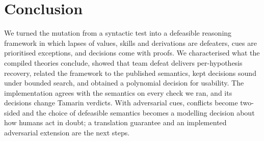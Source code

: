 \section{Conclusion}
\label{sec:conclusion}

We turned the \forget{} mutation from a syntactic test into a defeasible reasoning framework in which lapses of values, skills and derivations are defeaters, cues are prioritised exceptions, and decisions come with proofs. We characterised what the compiled theories conclude, showed that team defeat delivers per-hypothesis recovery, related the framework to the published semantics, kept decisions sound under bounded search, and obtained a polynomial decision for usability. The implementation agrees with the semantics on every check we ran, and its decisions change Tamarin verdicts. With adversarial cues, conflicts become two-sided and the choice of defeasible semantics becomes a modelling decision about how humans act in doubt; a translation guarantee and an implemented adversarial extension are the next steps.
